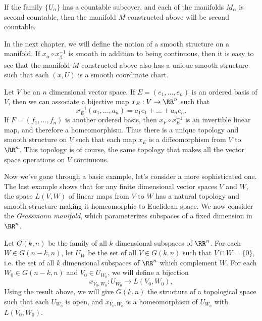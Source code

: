 \begin{remark}
    If the family $\{ U_\alpha \}$ has a countable subcover, and each of the manifolds $M_\alpha$ is second countable, then the manifold $M$ constructed above will be second countable.
\end{remark}

\begin{remark}
	In the next chapter, we will define the notion of a smooth structure on a manifold. If $x_\alpha \circ x_\beta^{-1}$ is smooth in addition to being continuous, then it is easy to see that the manifold $M$ constructed above also has a unique smooth structure such that each $(x,U)$ is a smooth coordinate chart.
\end{remark}

\begin{example}
    Let $V$ be an $n$ dimensional vector space. If $E = (e_1, \dots, e_n)$ is an ordered basis of $V$, then we can associate a bijective map $x_E: V \to \RR^n$ such that
    \[ x_E^{-1}(a_1, \dots, a_n) = a_1e_1 + \dots + a_ne_n. \]
    If $F = (f_1, \dots, f_n)$ is another ordered basis, then $x_F \circ x_E^{-1}$ is an invertible linear map, and therefore a homeomorphism. Thus there is a unique topology and smooth structure on $V$ such that each map $x_E$ is a diffeomorphism from $V$ to $\RR^n$. This topology is of course, the same topology that makes all the vector space operations on $V$ continuous.
\end{example}

Now we've gone through a basic example, let's consider a more sophisticated one. The last example shows that for any finite dimensional vector spaces $V$ and $W$, the space $L(V,W)$ of linear maps from $V$ to $W$ has a natural topology and smooth structure making it homeomorphic to Euclidean space. We now consider the \emph{Grassmann manifold}, which parameterizes subspaces of a fixed dimension in $\RR^n$.

Let $G(k,n)$ be the family of all $k$ dimensional subspaces of $\RR^n$. For each $W \in G(n-k,n)$, let $U_W$ be the set of all $V \in G(k,n)$ such that $V \cap W = \{ 0 \}$, i.e. the set of all $k$ dimensional subspaces of $\RR^n$ which complement $W$. For each $W_0 \in G(n-k,n)$ and $V_0 \in U_{W_0}$, we will define a bijection
%
\[ x_{V_0,W_0}: U_{W_0} \to L(V_0,W_0), \]
%
Using the result above, we will give $G(k,n)$ the structure of a topological space such that each $U_{W_0}$ is open, and $x_{V_0,W_0}$ is a homeomorphism of $U_{W_0}$ with $L(V_0,W_0)$.

